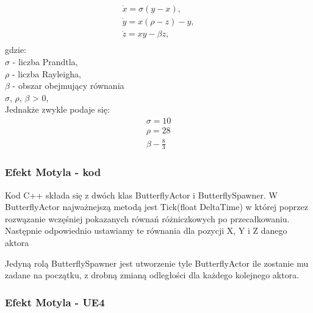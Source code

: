 \documentclass[a4paper,12pt,reqno]{article}
\begin{document}
\begin{equation}
\begin{split}
\dot{x}=\sigma(y-x),\\
\dot{y}=x(\rho-z)-y,\\
\dot{z}=xy-\beta z,\\
\end{split}
\end{equation}
gdzie:\\
$\sigma$ - liczba Prandtla,\\
$\rho$ - liczba Rayleigha,\\
$\beta$ - obszar obejmujący równania\\
$\sigma$, $\rho$, $\beta$ > 0,\\
Jednakże zwykle podaje się\cite{lorenz_dziwne_atraktory}:\\
\begin{equation}
\begin{split}
\sigma = 10\\
\rho = 28\\
\beta - \frac{8}{3}
\end{split}
\label{ButterflyVariables}
\end{equation}

\subsubsection{Efekt Motyla - kod}

Kod C++ składa się z dwóch klas ButterflyActor i ButterflySpawner.
W ButterflyActor najważnejszą metodą jest Tick(float DeltaTime) w której poprzez rozwązanie wczęśniej pokazanych równań różniczkowych po przecałkowaniu. Następnie odpowiednio ustawiamy te równania dla pozycji X, Y i Z danego aktora \cite{motyle_cpp}



Jedyną rolą ButterflySpawner jest utworzenie tyle ButterflyActor ile zostanie mu zadane na początku, z drobną zmianą odległości dla każdego kolejnego aktora.




\subsubsection{Efekt Motyla - UE4}
\end{document}

